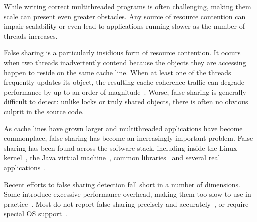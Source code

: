 
\label{sec:intro} 

While writing correct multithreaded programs is often challenging,
making them scale can present even greater obstacles. Any source of
resource contention can impair scalability or even lead to
applications running slower as the number of threads increases.

False sharing is a particularly insidious form of resource contention.
It occurs when two threads inadvertently contend because the objects
they are accessing happen to reside on the same cache line. When at least
one of the threads frequently updates its object, the resulting cache
coherence traffic can degrade performance by up to an order of
magnitude~\cite{falseshareeffect}. Worse, false sharing is generally
difficult to detect: unlike locks or truly shared objects, there is
often no obvious culprit in the source code.

As cache lines have grown larger and multithreaded applications have
become commonplace, false sharing has become an increasingly important
problem. False sharing has been found across the software stack,
including inside the Linux kernel~\cite{OSfalsesharing}, the Java
virtual machine~\cite{JVMfalsesharing}, common
libraries~\cite{libfalsesharing} and several real
applications~\cite{appfalsesharing, mysql}.

Recent efforts to false sharing detection fall short in a number of
dimensions. Some introduce excessive performance overhead, making them
too slow to use in practice~\cite{falseshare:simulator,
falseshare:binaryinstrumentation1,falseshare:binaryinstrumentation2}. Most
do not report false sharing precisely and
accurately~\cite{qinzhaodetection, detect:ptu, detect:intel,
falseshare:binaryinstrumentation1, DProf,
falseshare:binaryinstrumentation2}, or require special OS
support~\cite{OSdetection}.


